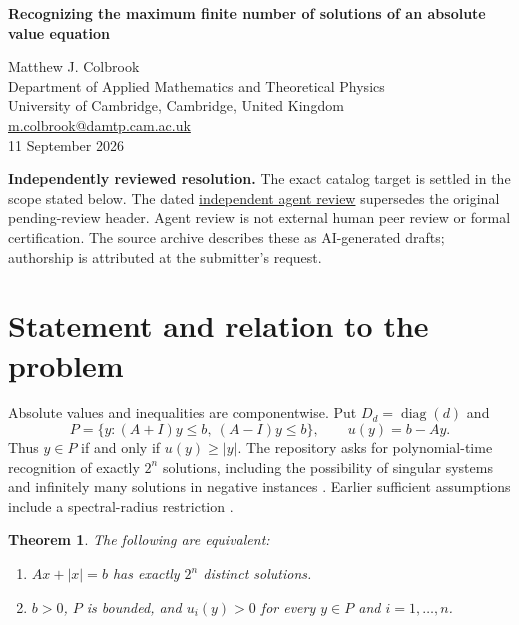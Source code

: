 \documentclass[11pt,a4paper]{article}
\newtheorem{theorem}{Theorem}
\theoremstyle{remark}\newtheorem{remark}[theorem]{Remark}
\newcommand{\R}{\mathbb R}
\newcommand{\diag}{\operatorname{diag}}
\newcommand{\header}[2]{\begin{center}{\Large\bfseries #1\par}\vspace{6pt}{\small #2\par}\end{center}\vspace{6pt}}
\begin{document}
\header{Recognizing the maximum finite number of solutions of an absolute value equation}{Repository AV-01. Claimed resolution; independent review pending.}
\begin{center}Matthew J. Colbrook\\{\small Department of Applied Mathematics and Theoretical Physics\\University of Cambridge, Cambridge, United Kingdom\\\href{mailto:m.colbrook@damtp.cam.ac.uk}{m.colbrook@damtp.cam.ac.uk}}\\11 September 2026\end{center}
\textbf{Independently reviewed resolution.} The exact catalog target is settled in the scope stated below.
The dated \href{https://github.com/MColbrook/OpenProblemsInNLA/blob/codex/colbrook-package-submissions/references/colbrook-intervals-2026-09-11/verification/reviews/AV-01-review.md}{independent agent review} supersedes the original pending-review header. Agent review is not external human peer review or formal certification. The source archive describes these as AI-generated drafts; authorship is attributed at the submitter's request.
\par\medskip
\begin{abstract}
For rational $A\in\R^{n\times n}$ and $b\in\R^n$, we give a polynomial-time test for whether $Ax+|x|=b$ has exactly $2^n$ distinct solutions. The test uses $n+1$ rational linear-programming feasibility problems. No nonsingularity or spectral-radius promise is required; infinite solution sets are rejected. The proof characterizes the maximum finite solution count by the geometry of a polytope with paired inequalities.
\end{abstract}
\section{Statement and relation to the problem}
Absolute values and inequalities are componentwise. Put $D_d=\diag(d)$ and
\[
 P=\{y:(A+I)y\le b,\ (A-I)y\le b\},\qquad u(y)=b-Ay.
\]
Thus $y\in P$ if and only if $u(y)\ge |y|$. The repository asks for polynomial-time recognition of exactly $2^n$ solutions, including the possibility of singular systems and infinitely many solutions in negative instances \cite{repo}. Earlier sufficient assumptions include a spectral-radius restriction \cite{hladik}.
\begin{theorem}\label{thm:main}
The following are equivalent:
\begin{enumerate}
\item $Ax+|x|=b$ has exactly $2^n$ distinct solutions.
\item $b>0$, $P$ is bounded, and $u_i(y)>0$ for every $y\in P$ and $i=1,\ldots,n$.
\end{enumerate}
\end{theorem}
\end{document}
